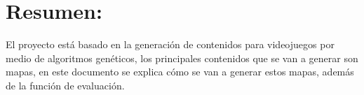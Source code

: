%
%

\section*{Resumen:}

El proyecto está basado en la generación de contenidos para videojuegos por medio de algoritmos genéticos, los principales contenidos que se van a generar son mapas, en este documento se explica cómo se van a generar estos mapas, además de la función de evaluación.\\

